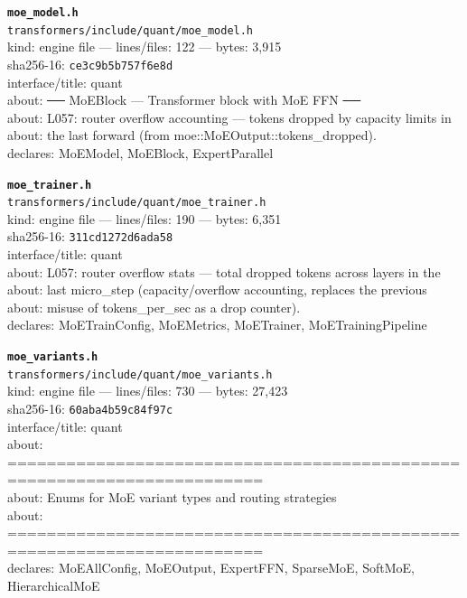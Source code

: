 \noindent\textbf{\texttt{moe\_model.h}}\\
\texttt{transformers/include/quant/moe\_model.h}\\
kind: engine file --- lines/files: 122 --- bytes: 3,915\\
sha256-16: \texttt{ce3c9b5b757f6e8d}\\
interface/title: quant\\
about: ── MoEBlock — Transformer block with MoE FFN ──\\
about: L057: router overflow accounting — tokens dropped by capacity limits in\\
about: the last forward (from moe::MoEOutput::tokens\_dropped).\\
declares: MoEModel, MoEBlock, ExpertParallel\\
\vspace*{6.0pt}

\noindent\textbf{\texttt{moe\_trainer.h}}\\
\texttt{transformers/include/quant/moe\_trainer.h}\\
kind: engine file --- lines/files: 190 --- bytes: 6,351\\
sha256-16: \texttt{311cd1272d6ada58}\\
interface/title: quant\\
about: L057: router overflow stats — total dropped tokens across layers in the\\
about: last micro\_step (capacity/overflow accounting, replaces the previous\\
about: misuse of tokens\_per\_sec as a drop counter).\\
declares: MoETrainConfig, MoEMetrics, MoETrainer, MoETrainingPipeline\\
\vspace*{6.0pt}

\noindent\textbf{\texttt{moe\_variants.h}}\\
\texttt{transformers/include/quant/moe\_variants.h}\\
kind: engine file --- lines/files: 730 --- bytes: 27,423\\
sha256-16: \texttt{60aba4b59c84f97c}\\
interface/title: quant\\
about: ========================================================================\\
about: Enums for MoE variant types and routing strategies\\
about: ========================================================================\\
declares: MoEAllConfig, MoEOutput, ExpertFFN, SparseMoE, SoftMoE, HierarchicalMoE\\
\vspace*{6.0pt}
\newpage

